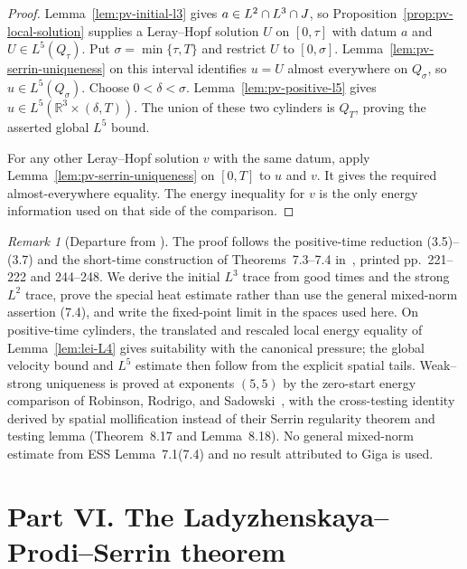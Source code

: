 \documentclass[11pt,letterpaper]{article}
\numberwithin{equation}{section}
\theoremstyle{plain}
\theoremstyle{definition}
\theoremstyle{remark}
\newtheorem{remark}[theorem]{Remark}
\begin{document}
\begin{proof}
Lemma~\ref{lem:pv-initial-l3} gives $a\in L^2\cap L^3\cap J$, so Proposition~\ref{prop:pv-local-solution} supplies a Leray--Hopf solution $U$ on $[0,\tau]$ with datum $a$ and $U\in L^5(Q_\tau)$. Put $\sigma=\min\{\tau,T\}$ and restrict $U$ to $[0,\sigma]$. Lemma~\ref{lem:pv-serrin-uniqueness} on this interval identifies $u=U$ almost everywhere on $Q_\sigma$, so $u\in L^5(Q_\sigma)$. Choose $0<\delta<\sigma$. Lemma~\ref{lem:pv-positive-l5} gives $u\in L^5(\mathbb R^3\times(\delta,T))$. The union of these two cylinders is $Q_T$, proving the asserted global $L^5$ bound.

For any other Leray--Hopf solution $v$ with the same datum, apply Lemma~\ref{lem:pv-serrin-uniqueness} on $[0,T]$ to $u$ and $v$. It gives the required almost-everywhere equality. The energy inequality for $v$ is the only energy information used on that side of the comparison.
\end{proof}

\begin{remark}[Departure from \cite{ESS2003}]\label{rem:pv-departure}
The proof follows the positive-time reduction (3.5)--(3.7) and the short-time construction of Theorems~7.3--7.4 in~\cite{ESS2003}, printed pp.~221--222 and 244--248. We derive the initial $L^3$ trace from good times and the strong $L^2$ trace, prove the special heat estimate rather than use the general mixed-norm assertion (7.4), and write the fixed-point limit in the spaces used here. On positive-time cylinders, the translated and rescaled local energy equality of Lemma~\ref{lem:lei-L4} gives suitability with the canonical pressure; the global velocity bound and $L^5$ estimate then follow from the explicit spatial tails. Weak--strong uniqueness is proved at exponents $(5,5)$ by the zero-start energy comparison of Robinson, Rodrigo, and Sadowski~\cite[(8.12), printed p.~174]{RobinsonRodrigoSadowski2016}, with the cross-testing identity derived by spatial mollification instead of their Serrin regularity theorem and testing lemma (Theorem~8.17 and Lemma~8.18). No general mixed-norm estimate from ESS Lemma~7.1(7.4) and no result attributed to Giga is used.
\end{remark}

\part*{Part VI. The Ladyzhenskaya--Prodi--Serrin theorem}
\end{document}
